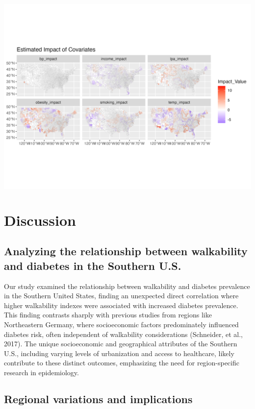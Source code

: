 \documentclass[
]{article}
\begin{document}
\begin{center}
\includegraphics{facet_plot.png}
\end{center}

\section{Discussion}\label{discussion}

\subsection{Analyzing the relationship between walkability and diabetes
in the Southern
U.S.}\label{analyzing-the-relationship-between-walkability-and-diabetes-in-the-southern-u.s.}

Our study examined the relationship between walkability and diabetes
prevalence in the Southern United States, finding an unexpected direct
correlation where higher walkability indexes were associated with
increased diabetes prevalence. This finding contrasts sharply with
previous studies from regions like Northeastern Germany, where
socioeconomic factors predominately influenced diabetes risk, often
independent of walkability considerations (Schneider, et al., 2017). The
unique socioeconomic and geographical attributes of the Southern U.S.,
including varying levels of urbanization and access to healthcare,
likely contribute to these distinct outcomes, emphasizing the need for
region-specific research in epidemiology.

\subsection{Regional variations and
implications}\label{regional-variations-and-implications}
\end{document}
